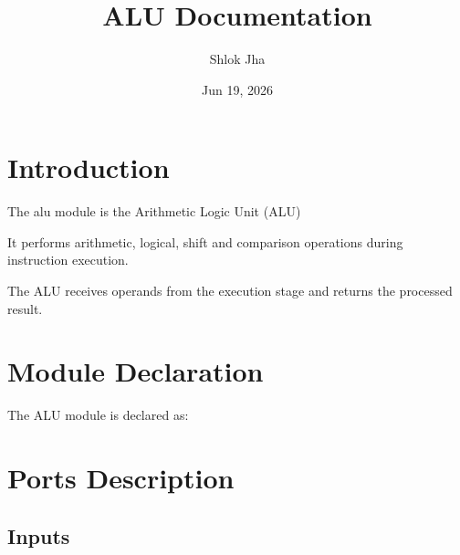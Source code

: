 \documentclass[letterpaper,10pt,english]{sphinxmanual}
\title{ALU Documentation}
\date{Jun 19, 2026}
\author{Shlok Jha}
\begin{document}
\pagestyle{empty}
\sphinxmaketitle
\pagestyle{plain}
\sphinxtableofcontents
\pagestyle{normal}
\label{\detokenize{index::doc}}


\sphinxstepscope


\chapter{Introduction}
\label{\detokenize{alu_intro:introduction}}\label{\detokenize{alu_intro::doc}}
\sphinxAtStartPar
The alu module is the Arithmetic Logic Unit (ALU)

\sphinxAtStartPar
It performs arithmetic, logical, shift and comparison
operations during instruction execution.

\sphinxAtStartPar
The ALU receives operands from the execution stage and
returns the processed result.

\sphinxstepscope


\chapter{Module Declaration}
\label{\detokenize{alu_moduledeclaration:module-declaration}}\label{\detokenize{alu_moduledeclaration::doc}}
\sphinxAtStartPar
The ALU module is declared as:

\begin{sphinxVerbatim}[commandchars=\\\{\}]
 
\end{sphinxVerbatim}

\sphinxstepscope


\chapter{Ports Description}
\label{\detokenize{alu_ports:ports-description}}\label{\detokenize{alu_ports::doc}}

\section{Inputs}
\label{\detokenize{alu_ports:inputs}}
\end{document}
